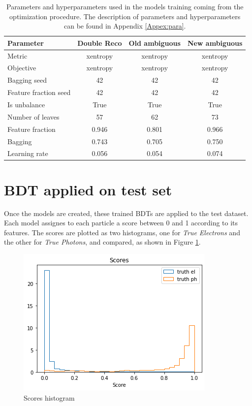 \documentclass[a4paper, oneside, 11pt, openright]{book}
\begin{document}
				\begin{table}
					\centering
					\begin{tabular}{lccc}
						\toprule[1.5pt]
						\textbf{Parameter} & \textbf{Double Reco} & \textbf{Old ambiguous} & \textbf{New ambiguous} \\
						\midrule
						Metric & xentropy & xentropy & xentropy \\
						Objective & xentropy & xentropy & xentropy \\
						Bagging seed & 42  & 42 & 42 \\
						Feature fraction seed & 42 & 42 & 42 \\
						Is unbalance & True & True & True \\
						Number of leaves & 57 & 62 & 73 \\
						Feature fraction & 0.946 & 0.801 & 0.966 \\
						Bagging & 0.743 & 0.705 & 0.750 \\
						Learning rate & 0.056 & 0.054 & 0.074 \\
						\bottomrule[1.5pt]
					\end{tabular}
					\caption{Parameters and hyperparameters used in the models training coming from the optimization procedure. The description of parameters and hyperparameters can be found in Appendix \ref{Appex:para}.}
					\label{tab:parameters} 
				\end{table}
		
			
			
		\section{BDT applied on test set}
			Once the models are created, these trained BDTs are applied to the test dataset. Each model assignes to each particle a score between 0 and 1 according to its features. %
			The scores are plotted as two histograms, one for \textit{True Electrons} and the other for \textit{True Photons}, and compared, as shown in Figure \ref{fig:scores}.
		    \begin{figure}[h!]
		    	\centering
		    	\includegraphics[width=.6\linewidth]{tesi_images/scores.png} 
		    	\caption{Scores histogram} 
		    	\label{fig:scores}
		    \end{figure}
		    
\end{document}
